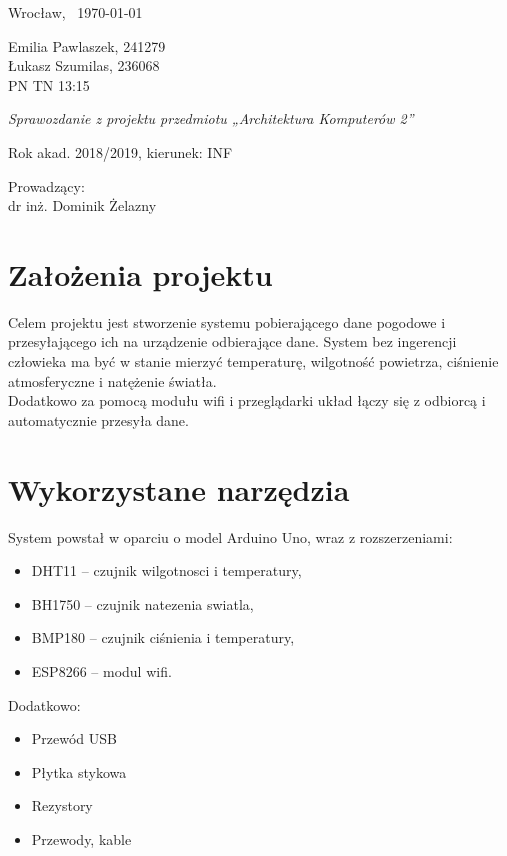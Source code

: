 \documentclass[polish, 11pt]{article}
\begin{document}
	\begin{flushright}
		Wrocław, \ \today\\
	\end{flushright}
	Emilia Pawlaszek, 241279\\
	Łukasz Szumilas, 236068\\
	
    \vspace{0,3cm}
    PN TN 13:15
	
	\vspace{2cm}
	\begin{center}
	\begin{Large}
	\emph{Sprawozdanie z projektu przedmiotu „Architektura Komputerów 2”}
	\end{Large}
	\end{center}
	\begin{center}
    Rok akad. 2018/2019, kierunek: INF
    \end{center}
	\begin{flushright}
	Prowadzący:\\
	dr inż. Dominik Żelazny
	\vspace{1cm}
	\end{flushright}
	\vfill
	
\newpage
\tableofcontents

\newpage
\section{Założenia projektu}
Celem projektu jest stworzenie systemu pobierającego dane pogodowe i przesyłającego ich na urządzenie odbierające dane. System bez ingerencji człowieka ma być w stanie mierzyć temperaturę, wilgotność powietrza, ciśnienie atmosferyczne i natężenie światła.\\
Dodatkowo za pomocą modułu wifi i przeglądarki układ łączy się z odbiorcą i automatycznie przesyła dane. 

\vspace{1cm}
\section{Wykorzystane narzędzia}
System powstał w oparciu o model Arduino Uno, wraz z rozszerzeniami:\\
\begin{itemize}
    \item DHT11 – czujnik wilgotnosci i temperatury,
    \item BH1750 – czujnik natezenia swiatla,
    \item BMP180 – czujnik ciśnienia i temperatury,
    \item ESP8266 – modul wifi.
\end{itemize}
Dodatkowo:
\begin{itemize}
    \item Przewód USB
    \item Płytka stykowa
    \item Rezystory
    \item Przewody, kable
\end{itemize}
\end{document}
